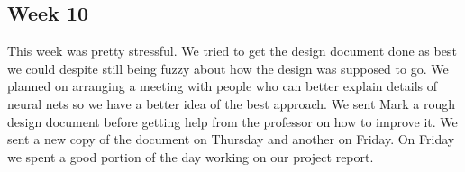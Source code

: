 \documentclass[onecolumn, draftclsnofoot,10pt, compsoc]{IEEEtran}
\begin{document}
\subsection{Week 10}
This week was pretty stressful.
We tried to get the design document done as best we could despite still being fuzzy about how the design was supposed to go.
We planned on arranging a meeting with people who can better explain details of neural nets so we have a better idea of the best approach.
We sent Mark a rough design document before getting help from the professor on how to improve it.
We sent a new copy of the document on Thursday and another on Friday.
On Friday we spent a good portion of the day working on our project report.
\end{document}
